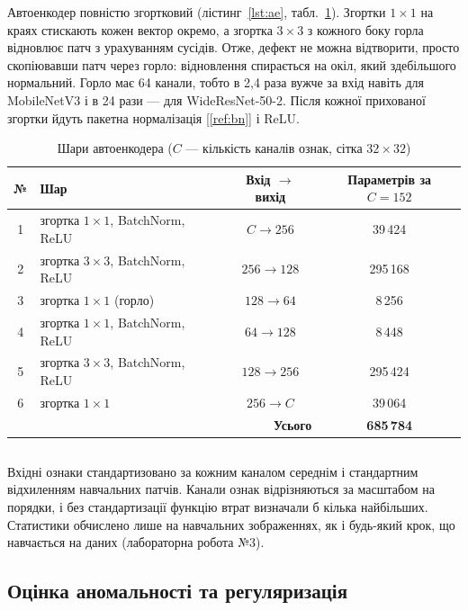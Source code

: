 \documentclass[14pt,a4paper]{extreport}
\begin{document}
Автоенкодер повністю згортковий (лістинг~\ref{lst:ae}, табл.~\ref{tab:ae}). Згортки $1 \times 1$ на краях стискають кожен вектор окремо, а згортка $3 \times 3$ з кожного боку горла відновлює патч з урахуванням сусідів. Отже, дефект не можна відтворити, просто скопіювавши патч через горло: відновлення спирається на окіл, який здебільшого нормальний. Горло має 64 канали, тобто в 2,4 раза вужче за вхід навіть для MobileNetV3 і в 24 рази --- для WideResNet-50-2. Після кожної прихованої згортки йдуть пакетна нормалізація [\ref{ref:bn}] і ReLU.

\begin{table}[H]
\caption{Шари автоенкодера ($C$ --- кількість каналів ознак, сітка $32 \times 32$)}
\label{tab:ae}
\small
\begin{tabularx}{\linewidth}{|c|X|c|c|}
\hline
\textbf{№} & \textbf{Шар} & \textbf{Вхід $\rightarrow$ вихід} & \textbf{Параметрів за $C = 152$} \\
\hline
1 & згортка $1 \times 1$, BatchNorm, ReLU & $C \rightarrow 256$ & 39\,424 \\
\hline
2 & згортка $3 \times 3$, BatchNorm, ReLU & $256 \rightarrow 128$ & 295\,168 \\
\hline
3 & згортка $1 \times 1$ (горло) & $128 \rightarrow 64$ & 8\,256 \\
\hline
4 & згортка $1 \times 1$, BatchNorm, ReLU & $64 \rightarrow 128$ & 8\,448 \\
\hline
5 & згортка $3 \times 3$, BatchNorm, ReLU & $128 \rightarrow 256$ & 295\,424 \\
\hline
6 & згортка $1 \times 1$ & $256 \rightarrow C$ & 39\,064 \\
\hline
\multicolumn{3}{|r|}{\textbf{Усього}} & \textbf{685\,784} \\
\hline
\end{tabularx}
\end{table}

\inputminted[firstline=87,lastline=104]{python}{../src/mk1/feature_ae.py}
\label{lst:ae}

Вхідні ознаки стандартизовано за кожним каналом середнім і стандартним відхиленням навчальних патчів. Канали ознак відрізняються за масштабом на порядки, і без стандартизації функцію втрат визначали б кілька найбільших. Статистики обчислено лише на навчальних зображеннях, як і будь-який крок, що навчається на даних (лабораторна робота №3).

\subsection{Оцінка аномальності та регуляризація}
\end{document}
